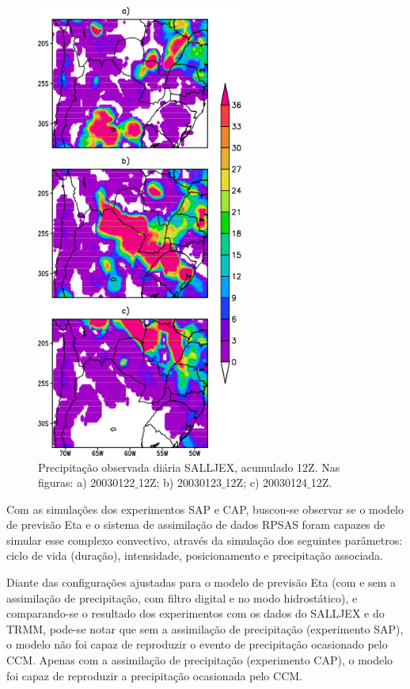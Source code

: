 \begin{figure}
\centering
\includegraphics[height=15cm]{./figs/prec_salljex1.png}
\caption{Precipitação observada diária SALLJEX, acumulado 12Z. Nas figuras: a) 20030122$\_$12Z; b) 20030123$\_$12Z; c) 20030124$\_$12Z.}
\label{fig62}
\end{figure}

\break

Com as simulações dos experimentos SAP e CAP, buscou-se observar se o modelo de previsão Eta e o sistema de assimilação de dados RPSAS foram capazes de simular esse complexo convectivo, através da simulação dos seguintes parâmetros: ciclo de vida (duração), intensidade, posicionamento e precipitação associada.

Diante das configurações ajustadas para o modelo de previsão Eta (com e sem a assimilação de precipitação, com filtro digital e no modo hidrostático), e comparando-se o resultado dos experimentos com os dados do SALLJEX e do TRMM, pode-se notar que sem a assimilação de precipitação (experimento SAP), o modelo não foi capaz de reproduzir o evento de precipitação ocasionado pelo CCM. Apenas com a assimilação de precipitação (experimento CAP), o modelo foi capaz de reproduzir a precipitação ocasionada pelo CCM.

